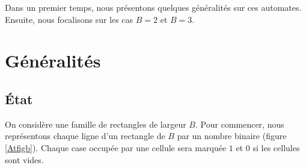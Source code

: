 Dans un premier temps, nous présentons quelques généralités sur ces automates. Ensuite, nous  focalisons sur les cas $B=2$ et  $B=3$. 
\section{Généralités}
\begin{spacing}{0.30}
\subsection{État}
\end{spacing}
On considère une famille de rectangles de largeur $B$.
Pour commencer, nous représentons chaque ligne d'un rectangle de $B$ par un nombre binaire (figure \ref{Atfigb}). Chaque case occupée par une cellule sera marquée $1$ et $0$ si les cellules sont vides.

